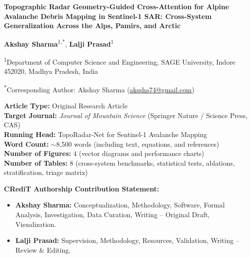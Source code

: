 \documentclass[12pt,a4paper]{article}
\begin{document}
\sloppy
\pagestyle{empty}

\begin{center}
{\Large\bfseries Topographic Radar Geometry-Guided Cross-Attention for Alpine Avalanche Debris Mapping in Sentinel-1 SAR: Cross-System Generalization Across the Alps, Pamirs, and Arctic\par}
\vspace{1.5em}

{\large \textbf{Akshay Sharma}\textsuperscript{1,*}, \textbf{Lalji Prasad}\textsuperscript{1}\par}
\vspace{1.0em}

{\small \textsuperscript{1}Department of Computer Science and Engineering, SAGE University, Indore 452020, Madhya Pradesh, India\par}
\vspace{0.8em}

{\small \textsuperscript{*}Corresponding Author: Akshay Sharma (\href{mailto:akssha74@gmail.com}{akssha74@gmail.com})\par}
\end{center}

\vspace{2.0em}

\noindent\textbf{Article Type:} Original Research Article \\[0.5em]
\noindent\textbf{Target Journal:} \textit{Journal of Mountain Science} (Springer Nature / Science Press, CAS) \\[0.5em]
\noindent\textbf{Running Head:} TopoRadar-Net for Sentinel-1 Avalanche Mapping \\[0.5em]
\noindent\textbf{Word Count:} $\sim$8,500 words (including text, equations, and references) \\[0.5em]
\noindent\textbf{Number of Figures:} 4 (vector diagrams and performance charts) \\[0.5em]
\noindent\textbf{Number of Tables:} 8 (cross-system benchmarks, statistical tests, ablations, stratification, triage matrix)

\vspace{1.5em}

\noindent\textbf{CRediT Authorship Contribution Statement:}
\begin{itemize}
    \item \textbf{Akshay Sharma:} Conceptualization, Methodology, Software, Formal Analysis, Investigation, Data Curation, Writing -- Original Draft, Visualization.
    \item \textbf{Lalji Prasad:} Supervision, Methodology, Resources, Validation, Writing -- Review \& Editing.
\end{itemize}
\end{document}
